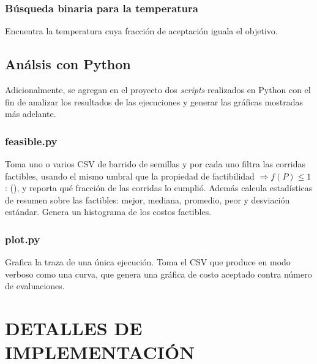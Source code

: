 \documentclass[9pt,a4paper,twocolumn,twoside]{tau-class/tau}
\begin{document}
        \subsubsection{B\'usqueda binaria para la temperatura}
        Encuentra la temperatura cuya fracci\'on de aceptaci\'on iguala el objetivo.

    \subsection{An\'alsis con Python}
    Adicionalmente, se agregan en el proyecto dos \textit{scripts} realizados en Python con el fin de analizar los resultados de las ejecuciones y generar las gr\'aficas mostradas más adelante.

    \subsubsection{feasible.py}


Toma uno o varios CSV de barrido de semillas y por cada uno filtra las corridas factibles, usando el mismo umbral que la propiedad de factibilidad $\Rightarrow f(P) \le 1$: (), y reporta qué fracción de las corridas lo cumplió. Además calcula estadísticas de resumen sobre las factibles: mejor, mediana, promedio, peor y desviación estándar. Genera un histograma de los costos factibles.


    
    \subsubsection{plot.py}
Grafica la traza de una única ejecución. Toma el CSV  que produce  en modo verboso como una curva, que genera una gráfica de costo aceptado contra número de evaluaciones. 
\section{DETALLES DE IMPLEMENTACIÓN}
\end{document}
